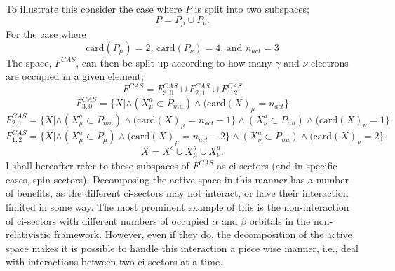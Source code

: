\documentclass[12pt]{article}
\begin{document}
\noindent To illustrate this consider the case where $P$ is split into two subspaces;
\begin{equation}
P = P_{\mu} \cup  P_{\nu}.
\end{equation}
For the case where
\begin{equation*}
\text{card}(P_{\mu}) = 2 
\text{, \ \ \ }
\text{card}(P_{\nu}) = 4
\text{, \ \ \ and \ \ \ }
n_{act} = 3
\end{equation*}
\noindent The space, $F^{CAS}$, can then be split up according to how many $\gamma$ and $\nu$
electrons are occupied in a given element;
\begin{equation*}
F^{CAS} = F^{CAS}_{3,0} \cup F^{CAS}_{2,1} \cup F^{CAS}_{1,2} 
\end{equation*}
\begin{equation*}
F^{CAS}_{3,0} = \{ X | \wedge (X^{a}_{\mu} \subset P_{mu}) \wedge ( \text{card}(X)_{\mu} = n_{act} \}
\end{equation*}
\begin{equation*}
F^{CAS}_{2,1} = \{ X | \wedge (X^{a}_{\mu} \subset P_{mu}) \wedge ( \text{card}(X)_{\mu} = n_{act}-1 \}
                       \wedge (X^{a}_{\nu} \subset P_{nu}) \wedge ( \text{card}(X)_{\nu} = 1 \}
\end{equation*}
\begin{equation*}
F^{CAS}_{1,2} = \{ X | \wedge (X^{a}_{\mu} \subset P_{\mu}) \wedge ( \text{card}(X)_{\mu} = n_{act}-2 \}
                       \wedge (X^{a}_{\nu} \subset P_{nu}) \wedge ( \text{card}(X)_{\nu} = 2 \}
\end{equation*}
\begin{equation*}
X = X^{c} \cup X^{a}_{\mu} \cup X^{a}_{\nu}.
\end{equation*}
\noindent I shall hereafter refer to these subspaces of $F^{CAS}$ as
ci-sectors (and in specific cases, spin-sectors). Decomposing the active space in
this manner has a number of benefits, as the different ci-sectors may not interact,
or have their interaction limited in some way.
The most prominent example of this is the non-interaction
of ci-sectors with different numbers of occupied $\alpha$ and $\beta$ orbitals 
in the non-relativistic framework.  However, even if they do,
the decomposition of the active space makes it is possible to handle
this interaction a piece wise manner, i.e., deal with interactions
between two ci-sectors at a time.
\end{document}
